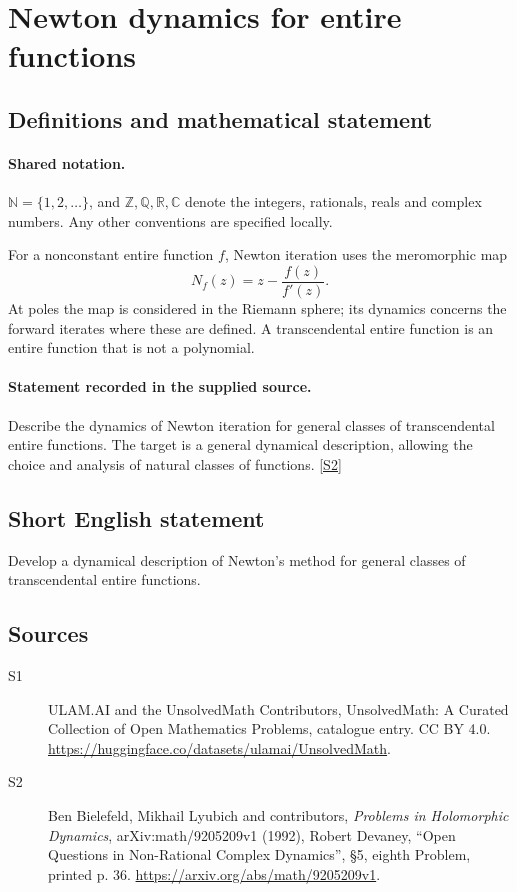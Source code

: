 \documentclass[11pt]{article}
\newcommand{\sref}[2]{\hyperlink{source:#1:#2}{[S#2]}}
\begin{document}
\section{Newton dynamics for entire functions}\label{statement}

\subsection{Definitions and mathematical statement}

\paragraph{Shared notation.}$\mathbb N=\{1,2,\ldots\}$, and $\mathbb Z,\mathbb Q,\mathbb R,\mathbb C$ denote the integers, rationals, reals and complex numbers. Any other conventions are specified locally.


For a nonconstant entire function $f$, Newton iteration uses the meromorphic map
\[N_f(z)=z-\frac{f(z)}{f'(z)}.\]
At poles the map is considered in the Riemann sphere; its dynamics concerns the forward iterates where these are defined. A transcendental entire function is an entire function that is not a polynomial.
\paragraph{Statement recorded in the supplied source.}
Describe the dynamics of Newton iteration for general classes of transcendental entire functions. The target is a general dynamical description, allowing the choice and analysis of natural classes of functions. \sref{statement}{2}
\subsection{Short English statement}
Develop a dynamical description of Newton’s method for general classes of transcendental entire functions.
\subsection{Sources}
\begin{description}
\item[\hypertarget{source:statement:1}{S1}] ULAM.AI and the UnsolvedMath Contributors, UnsolvedMath: A Curated Collection of Open Mathematics Problems, catalogue entry. CC BY 4.0. \url{https://huggingface.co/datasets/ulamai/UnsolvedMath}.
\item[\hypertarget{source:statement:2}{S2}] Ben Bielefeld, Mikhail Lyubich and contributors, \emph{Problems in Holomorphic Dynamics}, arXiv:math/9205209v1 (1992), Robert Devaney, ``Open Questions in Non-Rational Complex Dynamics'', \S5, eighth Problem, printed p. 36. \url{https://arxiv.org/abs/math/9205209v1}.
\end{description}
\label{end:statement}
\end{document}
